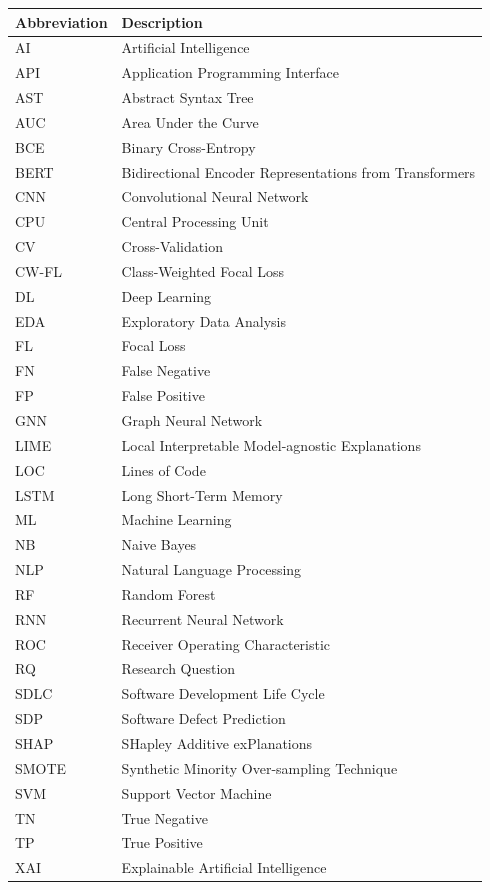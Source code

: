 \documentclass[12pt,a4paper,oneside]{report}
\newcommand{\tabfont}{\fontsize{11}{13}\selectfont\setlength{\tabcolsep}{4pt}}
\begin{document}
\begin{center}
\tabfont
\begin{tabular}{L{32mm}L{95mm}}
\toprule
\textbf{Abbreviation} & \textbf{Description} \\
\midrule
AI     & Artificial Intelligence \\
API    & Application Programming Interface \\
AST    & Abstract Syntax Tree \\
AUC    & Area Under the Curve \\
BCE    & Binary Cross-Entropy \\
BERT   & Bidirectional Encoder Representations from Transformers \\
CNN    & Convolutional Neural Network \\
CPU    & Central Processing Unit \\
CV     & Cross-Validation \\
CW-FL  & Class-Weighted Focal Loss \\
DL     & Deep Learning \\
EDA    & Exploratory Data Analysis \\
FL     & Focal Loss \\
FN     & False Negative \\
FP     & False Positive \\
GNN    & Graph Neural Network \\
LIME   & Local Interpretable Model-agnostic Explanations \\
LOC    & Lines of Code \\
LSTM   & Long Short-Term Memory \\
ML     & Machine Learning \\
NB     & Naive Bayes \\
NLP    & Natural Language Processing \\
RF     & Random Forest \\
RNN    & Recurrent Neural Network \\
ROC    & Receiver Operating Characteristic \\
RQ     & Research Question \\
SDLC   & Software Development Life Cycle \\
SDP    & Software Defect Prediction \\
SHAP   & SHapley Additive exPlanations \\
SMOTE  & Synthetic Minority Over-sampling Technique \\
SVM    & Support Vector Machine \\
TN     & True Negative \\
TP     & True Positive \\
XAI    & Explainable Artificial Intelligence \\
\bottomrule
\end{tabular}
\end{center}
\end{document}
